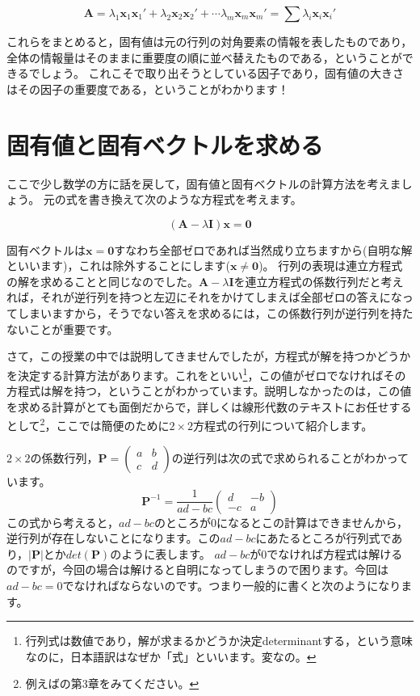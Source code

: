 \documentclass{ltjsbook}
\begin{document}
\[
    \bm{A}= \lambda_1 \bm{x}_1 \bm{x}_1' + \lambda_2 \bm{x}_2 \bm{x}_2' + \cdots \lambda_m \bm{x}_m \bm{x}_m'= \sum \lambda_{i} \bm{x}_{i} \bm{x}_i'
\]

これらをまとめると，固有値は元の行列の対角要素の情報を表したものであり，全体の情報量はそのままに重要度の順に並べ替えたものである，ということができるでしょう。
これこそで取り出そうとしている因子であり，固有値の大きさはその因子の重要度である，ということがわかります！

\section{固有値と固有ベクトルを求める}
ここで少し数学の方に話を戻して，固有値と固有ベクトルの計算方法を考えましょう。
元の式を書き換えて次のような方程式を考えます。

\[ (\bm{A} - \lambda\bm{I})\bm{x} = \bm{0} \]

固有ベクトルは$\bm{x}=\bm{0}$すなわち全部ゼロであれば当然成り立ちますから(自明な解といいます)，これは除外することにします($\bm{x}\neq \bm{0}$)。
行列の表現は連立方程式の解を求めることと同じなのでした。$\bm{A} - \lambda\bm{I}$を連立方程式の係数行列だと考えれば，それが逆行列を持つと左辺にそれをかけてしまえば全部ゼロの答えになってしまいますから，そうでない答えを求めるには，この係数行列が逆行列を持たないことが重要です。

さて，この授業の中では説明してきませんでしたが，方程式が解を持つかどうかを決定する計算方法があります。これをといい\footnote{行列式は数値であり，解が求まるかどうか決定determinantする，という意味なのに，日本語訳はなぜか「式」といいます。変なの。}，この値がゼロでなければその方程式は解を持つ，ということがわかっています。説明しなかったのは，この値を求める計算がとても面倒だからで，詳しくは線形代数のテキストにお任せするとして\footnote{例えば\citet{村上正康2016-03-01}の第3章をみてください。}，ここでは簡便のために$2\times2$方程式の行列について紹介します。

$2 \times 2$の係数行列，$\bm{P}=\begin{pmatrix} a&b\\c&d \end{pmatrix}$の逆行列は次の式で求められることがわかっています。
\[ \bm{P}^{-1}= \frac{1}{ad-bc}\begin{pmatrix}d & -b \\ -c &a \end{pmatrix} \]
この式から考えると，$ad - bc$のところが0になるとこの計算はできませんから，逆行列が存在しないことになります。この$ad-bc$にあたるところが行列式であり，$|\bm{P}|$とか$det(\bm{P})$のように表します。
$ad-bc$が0でなければ方程式は解けるのですが，今回の場合は解けると自明になってしまうので困ります。今回は$ad-bc=0$でなければならないのです。つまり一般的に書くと次のようになります。
\end{document}
